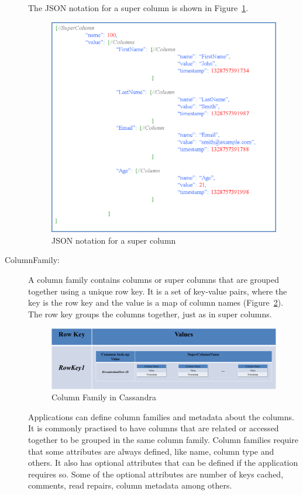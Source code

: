 \begin{description}
The JSON notation for a super column is shown in Figure~\ref{f:supercolumn-JSON}. 

\begin{figure}[H]
	\centering
	\includegraphics[width=.6\textwidth]{./figure/Example/JSON_SuperColumn_John.png}
	\caption{JSON notation for a super column}\label{f:supercolumn-JSON}
\end{figure}

\item [ColumnFamily:] A column family contains columns or super columns that are
grouped together using a unique row key.  It is a set of key-value
pairs,   where the key is the row key and the value is a map of column names
(Figure~\ref{f:columnfamily}).  The row key groups the columns together,   just as
in super columns. 

\begin{figure}[H]
	\centering
	\includegraphics[width=.8\textwidth]{./figure/Example/ColumnFamily.png}
	\caption{Column Family in Cassandra}\label{f:columnfamily}
\end{figure}

Applications can define column families and metadata about the columns. 
It is commonly practised to have columns that are related or accessed
together to be grouped in the same column family.  Column families require that
some attributes are always defined,   like name,   column type and others.  It
also has optional attributes that can be defined if the application requires so.
 Some of the optional attributes are number of keys cached,   comments,   read
repairs,   column metadata among others.


\end{description}

